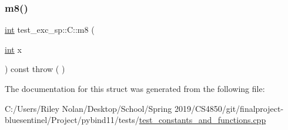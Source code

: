 \mbox{\label{structtest__exc__sp_1_1_c_a1b4efac93c03723fff1e17f4d07d165e}} 
\subsubsection{\texorpdfstring{m8()}{m8()}}
{\footnotesize\ttfamily \mbox{\hyperlink{warnings_8h_a74f207b5aa4ba51c3a2ad59b219a423b}{int}} test\+\_\+exc\+\_\+sp\+::\+C\+::m8 (\begin{DoxyParamCaption}\item[{\mbox{\hyperlink{warnings_8h_a74f207b5aa4ba51c3a2ad59b219a423b}{int}}}]{x }\end{DoxyParamCaption}) const throw ( ) \hspace{0.3cm}{\ttfamily [inline]}}



The documentation for this struct was generated from the following file\+:\begin{DoxyCompactItemize}
\item 
C\+:/\+Users/\+Riley Nolan/\+Desktop/\+School/\+Spring 2019/\+C\+S4850/git/finalproject-\/bluesentinel/\+Project/pybind11/tests/\mbox{\hyperlink{test__constants__and__functions_8cpp}{test\+\_\+constants\+\_\+and\+\_\+functions.\+cpp}}\end{DoxyCompactItemize}

